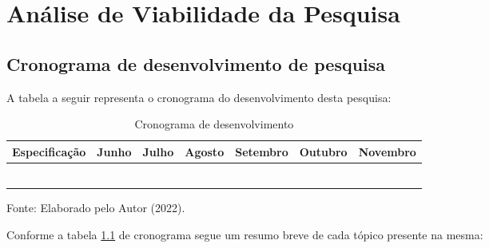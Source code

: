 \chapter{Análise de Viabilidade da Pesquisa}
\label{ch:analise-de-viabilidade-da-pesquisa}


\section{Cronograma de desenvolvimento de pesquisa}
\label{sec:cronograma-de-desenvolvimento-de-pesquisa}

A tabela a seguir representa o cronograma do
desenvolvimento desta pesquisa:

\begin{table}[h!]
    \newcommand{\fillCell}{\cellcolor[HTML]{CBCEFB}}
    \begin{tabular}{|p{2cm}|l|l|l|l|l|l|}
        \hline
        \rowcolor[HTML]{CBCEFB}
        Especificação & Junho & Julho & Agosto & Setembro & Outubro
        & Novembro
        \\ \hline
        & \fillCell & & & & &
        \\ \hline
        & & \fillCell & & & &
        \\ \hline
        & & & \fillCell & \fillCell &           & \\ \hline
        & & & & & \fillCell &
        \\ \hline
        & & &           &           & \fillCell & \\ \hline
        & & & & & & \fillCell
        \\ \hline
    \end{tabular}
    \center Fonte: Elaborado pelo Autor (2022).
    \label{table:cronograma-pesquisa}
    \caption[Cronograma de desenvolvimento]{Cronograma de
    desenvolvimento}
\end{table}

Conforme a tabela \ref{table:cronograma-pesquisa} de cronograma
segue um resumo breve de cada tópico presente na mesma: